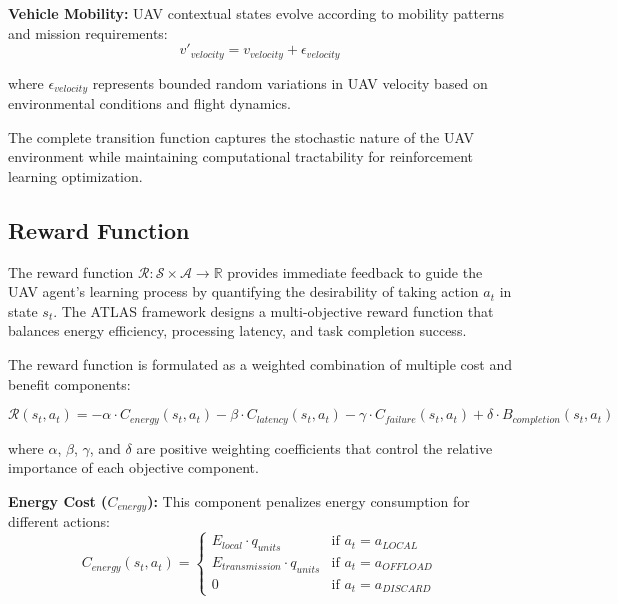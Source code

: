 \documentclass[journal]{IEEEtran}
\begin{document}
\textbf{Vehicle Mobility:} UAV contextual states evolve according to mobility patterns and mission requirements:
\begin{equation}
v'_{velocity} = v_{velocity} + \epsilon_{velocity}
\end{equation}

where $\epsilon_{velocity}$ represents bounded random variations in UAV velocity based on environmental conditions and flight dynamics.

The complete transition function captures the stochastic nature of the UAV environment while maintaining computational tractability for reinforcement learning optimization.

\subsection{Reward Function}

The reward function $\mathcal{R}: \mathcal{S} \times \mathcal{A} \rightarrow \mathbb{R}$ provides immediate feedback to guide the UAV agent's learning process by quantifying the desirability of taking action $a_t$ in state $s_t$. The ATLAS framework designs a multi-objective reward function that balances energy efficiency, processing latency, and task completion success.

The reward function is formulated as a weighted combination of multiple cost and benefit components:

\begin{equation}
\mathcal{R}(s_t, a_t) = -\alpha \cdot C_{energy}(s_t, a_t) - \beta \cdot C_{latency}(s_t, a_t) - \gamma \cdot C_{failure}(s_t, a_t) + \delta \cdot B_{completion}(s_t, a_t)
\end{equation}

where $\alpha$, $\beta$, $\gamma$, and $\delta$ are positive weighting coefficients that control the relative importance of each objective component.

\textbf{Energy Cost ($C_{energy}$):} This component penalizes energy consumption for different actions:
\begin{equation}
C_{energy}(s_t, a_t) = \begin{cases}
E_{local} \cdot q_{units} & \text{if } a_t = a_{LOCAL} \\
E_{transmission} \cdot q_{units} & \text{if } a_t = a_{OFFLOAD} \\
0 & \text{if } a_t = a_{DISCARD}
\end{cases}
\end{equation}
\end{document}
